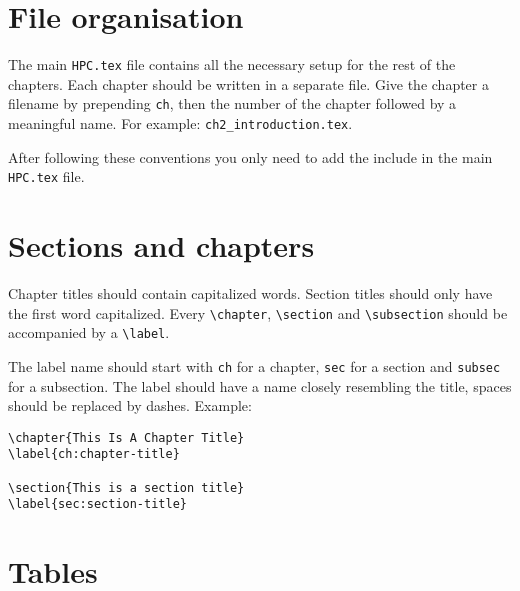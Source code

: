 \documentclass[11pt,a4paper]{article}
\begin{document}
\maketitle

\section{File organisation}
\label{sec:file-organisation}

The main \texttt{HPC.tex} file contains all the necessary setup for the rest of
the chapters. Each chapter should be written in a separate file. Give the
chapter a filename by prepending \texttt{ch}, then the number of the chapter
followed by a meaningful name. For example: \texttt{ch2\_introduction.tex}.

After following these conventions you only need to add the include in the main
\texttt{HPC.tex} file.

\section{Sections and chapters}
\label{sec:sections-and-chapters}

Chapter titles should contain capitalized words. Section titles should only
have the first word capitalized. Every \texttt{\textbackslash{}chapter},
\texttt{\textbackslash{}section} and \texttt{\textbackslash{}subsection} should
be accompanied by a \texttt{\textbackslash{}label}.

The label name should start with \texttt{ch} for a chapter, \texttt{sec} for a
section and \texttt{subsec} for a subsection. The label should have a name
closely resembling the title, spaces should be replaced by dashes. Example:

\begin{verbatim}
\chapter{This Is A Chapter Title}
\label{ch:chapter-title}

\section{This is a section title}
\label{sec:section-title}
\end{verbatim}

\section{Tables}
\label{sec:tables}
\end{document}

